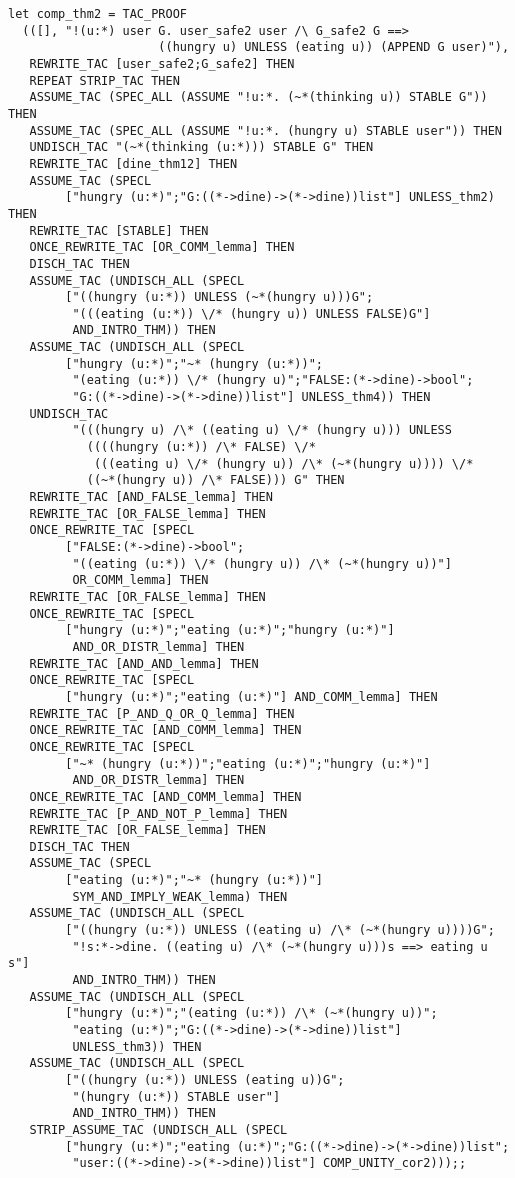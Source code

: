 {\footnotesize 
\begin{verbatim}
let comp_thm2 = TAC_PROOF
  (([], "!(u:*) user G. user_safe2 user /\ G_safe2 G ==>
                     ((hungry u) UNLESS (eating u)) (APPEND G user)"),
   REWRITE_TAC [user_safe2;G_safe2] THEN
   REPEAT STRIP_TAC THEN
   ASSUME_TAC (SPEC_ALL (ASSUME "!u:*. (~*(thinking u)) STABLE G")) THEN
   ASSUME_TAC (SPEC_ALL (ASSUME "!u:*. (hungry u) STABLE user")) THEN
   UNDISCH_TAC "(~*(thinking (u:*))) STABLE G" THEN
   REWRITE_TAC [dine_thm12] THEN
   ASSUME_TAC (SPECL
        ["hungry (u:*)";"G:((*->dine)->(*->dine))list"] UNLESS_thm2) THEN
   REWRITE_TAC [STABLE] THEN
   ONCE_REWRITE_TAC [OR_COMM_lemma] THEN
   DISCH_TAC THEN
   ASSUME_TAC (UNDISCH_ALL (SPECL
        ["((hungry (u:*)) UNLESS (~*(hungry u)))G";
         "(((eating (u:*)) \/* (hungry u)) UNLESS FALSE)G"]
         AND_INTRO_THM)) THEN
   ASSUME_TAC (UNDISCH_ALL (SPECL
        ["hungry (u:*)";"~* (hungry (u:*))";
         "(eating (u:*)) \/* (hungry u)";"FALSE:(*->dine)->bool";
         "G:((*->dine)->(*->dine))list"] UNLESS_thm4)) THEN
   UNDISCH_TAC
         "(((hungry u) /\* ((eating u) \/* (hungry u))) UNLESS
           ((((hungry (u:*)) /\* FALSE) \/*
            (((eating u) \/* (hungry u)) /\* (~*(hungry u)))) \/*
           ((~*(hungry u)) /\* FALSE))) G" THEN
   REWRITE_TAC [AND_FALSE_lemma] THEN
   REWRITE_TAC [OR_FALSE_lemma] THEN
   ONCE_REWRITE_TAC [SPECL
        ["FALSE:(*->dine)->bool";
         "((eating (u:*)) \/* (hungry u)) /\* (~*(hungry u))"]
         OR_COMM_lemma] THEN
   REWRITE_TAC [OR_FALSE_lemma] THEN
   ONCE_REWRITE_TAC [SPECL
        ["hungry (u:*)";"eating (u:*)";"hungry (u:*)"]
         AND_OR_DISTR_lemma] THEN
   REWRITE_TAC [AND_AND_lemma] THEN
   ONCE_REWRITE_TAC [SPECL
        ["hungry (u:*)";"eating (u:*)"] AND_COMM_lemma] THEN
   REWRITE_TAC [P_AND_Q_OR_Q_lemma] THEN
   ONCE_REWRITE_TAC [AND_COMM_lemma] THEN
   ONCE_REWRITE_TAC [SPECL
        ["~* (hungry (u:*))";"eating (u:*)";"hungry (u:*)"]
         AND_OR_DISTR_lemma] THEN
   ONCE_REWRITE_TAC [AND_COMM_lemma] THEN
   REWRITE_TAC [P_AND_NOT_P_lemma] THEN
   REWRITE_TAC [OR_FALSE_lemma] THEN
   DISCH_TAC THEN
   ASSUME_TAC (SPECL
        ["eating (u:*)";"~* (hungry (u:*))"]
         SYM_AND_IMPLY_WEAK_lemma) THEN
   ASSUME_TAC (UNDISCH_ALL (SPECL
        ["((hungry (u:*)) UNLESS ((eating u) /\* (~*(hungry u))))G";
         "!s:*->dine. ((eating u) /\* (~*(hungry u)))s ==> eating u s"]
         AND_INTRO_THM)) THEN
   ASSUME_TAC (UNDISCH_ALL (SPECL
        ["hungry (u:*)";"(eating (u:*)) /\* (~*(hungry u))";
         "eating (u:*)";"G:((*->dine)->(*->dine))list"]
         UNLESS_thm3)) THEN
   ASSUME_TAC (UNDISCH_ALL (SPECL
        ["((hungry (u:*)) UNLESS (eating u))G";
         "(hungry (u:*)) STABLE user"]
         AND_INTRO_THM)) THEN
   STRIP_ASSUME_TAC (UNDISCH_ALL (SPECL
        ["hungry (u:*)";"eating (u:*)";"G:((*->dine)->(*->dine))list";
         "user:((*->dine)->(*->dine))list"] COMP_UNITY_cor2)));;
\end{verbatim}
}

